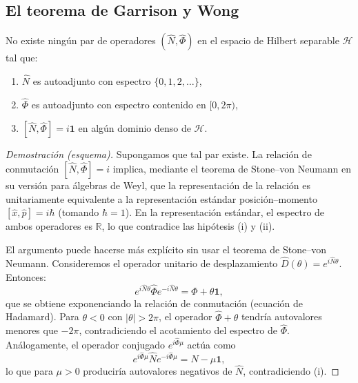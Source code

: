         \subsection{El teorema de Garrison y Wong}
        
            \begin{theorem}
            No existe ningún par de operadores $(\hat{N}, \hat{\Phi})$ en el espacio de Hilbert separable $\mathcal{H}$ tal que:
            \begin{enumerate}[label=(\roman*)]
                \item $\hat{N}$ es autoadjunto con espectro $\{0, 1, 2, \ldots\}$,
                \item $\hat{\Phi}$ es autoadjunto con espectro contenido en $[0, 2\pi)$,
                \item $[\hat{N}, \hat{\Phi}] = i\mathbf{1}$ en algún dominio denso de $\mathcal{H}$.
            \end{enumerate}
            \end{theorem}
            
            \begin{proof}[Demostración (esquema)]
            Supongamos que tal par existe. La relación de conmutación $[\hat{N}, \hat{\Phi}] = i$ implica, mediante el teorema de Stone--von Neumann en su versión para álgebras de Weyl, que la representación de la relación es unitariamente equivalente a la representación estándar posición--momento $[\hat{x}, \hat{p}] = i\hbar$ (tomando $\hbar = 1$). En la representación estándar, el espectro de ambos operadores es $\mathbb{R}$, lo que contradice las hipótesis (i) y (ii).
            
            El argumento puede hacerse más explícito sin usar el teorema de Stone--von Neumann. Consideremos el operador unitario de desplazamiento $\hat{D}(\theta) = e^{i\hat{N}\theta}$. Entonces:
            \begin{equation}
                e^{i\hat{N}\theta} \hat{\Phi} e^{-i\hat{N}\theta} = \hat{\Phi} + \theta \mathbf{1},
                \label{eq:GW_traslacion}
            \end{equation}
            que se obtiene exponenciando la relación de conmutación (ecuación de Hadamard). Para $\theta < 0$ con $|\theta| > 2\pi$, el operador $\hat{\Phi} + \theta$ tendría autovalores menores que $-2\pi$, contradiciendo el acotamiento del espectro de $\hat{\Phi}$. Análogamente, el operador conjugado $e^{i\hat{\Phi}\mu}$ actúa como
            \begin{equation}
                e^{i\hat{\Phi}\mu}\hat{N} e^{-i\hat{\Phi}\mu} = \hat{N} - \mu\mathbf{1},
            \end{equation}
            lo que para $\mu > 0$ produciría autovalores negativos de $\hat{N}$, contradiciendo (i).
        \end{proof}
 
